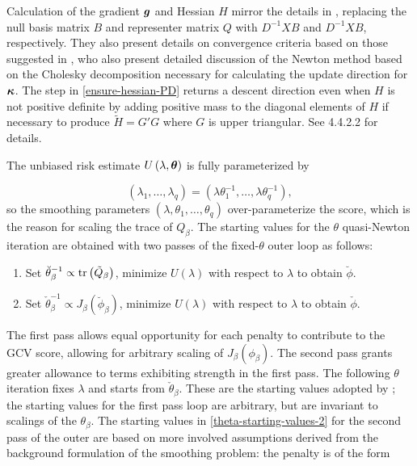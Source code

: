 Calculation of the gradient $\mbox{\boldmath $g$}$ and Hessian $H$ mirror the details in \cite{gu1991minimizing}, replacing the null basis matrix $B$ and representer matrix $Q$ with $D^{-1}XB$ and $D^{-1}XB$, respectively. They also present details on convergence criteria based on those suggested in \cite{gill1981practical}, who also present detailed discussion of the Newton method based on the Cholesky decomposition necessary for calculating the update direction for $\mbox{\boldmath $\kappa$}$. The step in \ref{ensure-hessian-PD} returns a descent direction even when $H$ is not positive definite by adding positive mass to the diagonal elements of $H$ if necessary to produce $\tilde{H} = G'G$ where $G$ is upper triangular. See \cite{gill1981practical} 4.4.2.2 for details. 
\bigskip

The unbiased risk estimate $U\left(\lambda, \mbox{\boldmath $\theta$}\right)$ is fully parameterized by 

\begin{equation}
\left(\lambda_1, \dots, \lambda_q\right) = \left(\lambda \theta^{-1}_1, \dots, \lambda \theta^{-1}_q\right),
\end{equation}
\noindent
so the smoothing parameters $\left(\lambda, \theta_1, \dots, \theta_q\right)$ over-parameterize the score, which is the reason for scaling the trace of $Q_\beta$. The starting values for the $\theta$ quasi-Newton iteration are obtained with two passes of the fixed-$\theta$ outer loop as follows:

\begin{enumerate}
\item Set $\breve{\theta}_\beta^{-1} \propto \mbox{tr}\left( \tilde{Q}_\beta \right)$, minimize $U\left(\lambda\right)$ with respect to $\lambda$ to obtain $\breve{\phi}$. \label{theta-starting-values-1}
\item Set $\check{\theta}_\beta^{-1} \propto  J_\beta\left(\breve{\phi}_\beta \right)$, minimize $U\left(\lambda\right)$ with respect to $\lambda$ to obtain $\check{\phi}$. \label{theta-starting-values-2}
\end{enumerate}
\noindent
The first pass allows equal opportunity for each penalty to contribute to the GCV score, allowing for arbitrary scaling of $J_\beta \left(\phi_\beta\right)$. The second pass grants greater allowance to terms exhibiting strength in the first pass. The following $\theta$ iteration fixes $\lambda$ and starts from $\check{\theta}_\beta$. These are the starting values adopted by \cite{gu1991minimizing}; the starting values for the first pass loop are arbitrary, but are invariant to scalings of the $\theta_\beta$. The starting values in \ref{theta-starting-values-2} for the second pass of the outer are based on more involved assumptions derived from the background formulation of the smoothing problem: the penalty is of the form


